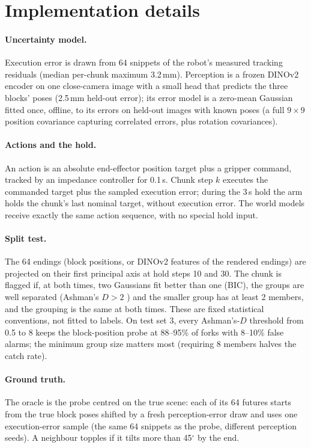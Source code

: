 \documentclass{article}
\begin{document}
\section{Implementation details}\label{app:details}
\paragraph{Uncertainty model.} Execution error is drawn from 64 snippets of the robot's measured tracking
residuals (median per-chunk maximum 3.2\,mm). Perception is a frozen DINOv2 encoder on one close-camera
image with a small head that predicts the three blocks' poses (2.5\,mm held-out error); its error model
is a zero-mean Gaussian fitted once, offline, to its errors on held-out images with known poses (a full
$9\times9$ position covariance capturing correlated errors, plus rotation covariances).

\paragraph{Actions and the hold.} An action is an absolute end-effector position target plus a gripper
command, tracked by an impedance controller for 0.1\,s. Chunk step $k$ executes the commanded target plus
the sampled execution error; during the 3\,s hold the arm holds the chunk's last nominal target, without
execution error. The world models receive exactly the same action sequence, with no special hold input.

\paragraph{Split test.} The 64 endings (block positions, or DINOv2 features of the rendered endings) are
projected on their first principal axis at hold steps 10 and 30. The chunk is flagged if, at both times,
two Gaussians fit better than one (BIC), the groups are well separated (Ashman's $D>2$
\citep{ashman1994detecting}) and the smaller group has at least 2 members, and the grouping is the same
at both times. These are fixed statistical conventions, not fitted to labels. On test set 3, every
Ashman's-$D$ threshold from 0.5 to 8 keeps the block-position probe at 88--95\% of forks with 8--10\%
false alarms; the minimum group size matters most (requiring 8 members halves the catch rate).

\paragraph{Ground truth.} The oracle is the probe centred on the true scene: each of its 64 futures starts
from the true block poses shifted by a fresh perception-error draw and uses one execution-error sample (the
same 64 snippets as the probe, different perception seeds). A neighbour topples if it tilts more than
45$^\circ$ by the end.
\end{document}
